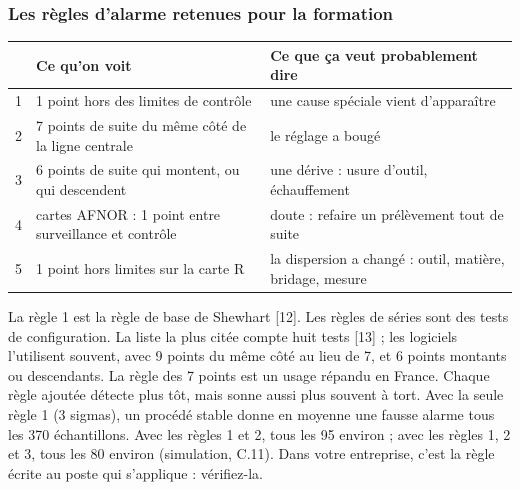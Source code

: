 \documentclass[11pt,a4paper]{article}
\begin{document}
\subsubsection*{Les règles d'alarme retenues pour la formation}\label{sec:regles}
\begin{center}\small
\begin{tabularx}{\textwidth}{@{}cXX@{}}\toprule
 & \textbf{Ce qu'on voit} & \textbf{Ce que ça veut probablement dire}\\\midrule
1 & 1 point hors des limites de contrôle & une cause spéciale vient d'apparaître\\
2 & 7 points de suite du même côté de la ligne centrale & le réglage a bougé\\
3 & 6 points de suite qui montent, ou qui descendent & une dérive : usure d'outil, échauffement\\
4 & cartes AFNOR : 1 point entre surveillance et contrôle & doute : refaire un prélèvement tout de suite\\
5 & 1 point hors limites sur la carte R & la dispersion a changé : outil, matière, bridage, mesure\\\bottomrule
\end{tabularx}
\end{center}

\begin{note}
La règle 1 est la règle de base de Shewhart [12]. Les règles de séries sont des tests de configuration. La liste la plus citée compte huit tests [13] ; les logiciels l'utilisent souvent, avec 9 points du même côté au lieu de 7, et 6 points montants ou descendants. La règle des 7 points est un usage répandu en France. Chaque règle ajoutée détecte plus tôt, mais sonne aussi plus souvent à tort. Avec la seule règle 1 (3 sigmas), un procédé stable donne en moyenne une fausse alarme tous les 370 échantillons. Avec les règles 1 et 2, tous les 95 environ ; avec les règles 1, 2 et 3, tous les 80 environ (simulation, C.11). Dans votre entreprise, c'est la règle écrite au poste qui s'applique : vérifiez-la.
\end{note}
\end{document}
